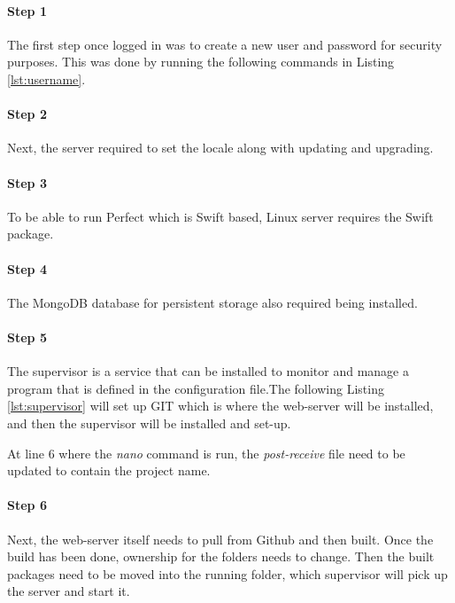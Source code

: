 \paragraph{Step 1}
The first step once logged in was to create a new user and password for security purposes. This was done by running the following commands in Listing \ref{lst:username}.



\paragraph{Step 2}
Next, the server required to set the locale along with updating and upgrading.


\paragraph{Step 3}
To be able to run Perfect which is Swift based, Linux server requires the Swift package.


\paragraph{Step 4}
The MongoDB database for persistent storage also required being installed.


\paragraph{Step 5}
The supervisor is a service that can be installed to monitor and manage a program that is defined in the configuration file.The following Listing \ref{lst:supervisor} will set up GIT which is where the web-server will be installed, and then the supervisor will be installed and set-up.

At line 6 where the \textit{nano} command is run, the \textit{post-receive} file need to be updated to contain the project name.

\paragraph{Step 6}
Next, the web-server itself needs to pull from Github and then built. Once the build has been done, ownership for the folders needs to change. Then the built packages need to be moved into the running folder, which supervisor will pick up the server and start it.


